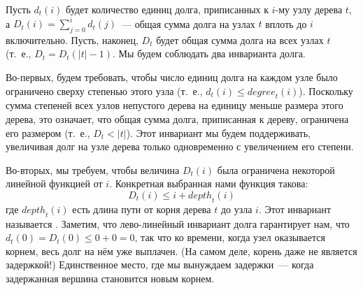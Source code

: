 Пусть $d_t(i)$ будет количество единиц долга, приписанных к $i$-му
узлу дерева $t$, а $D_t(i) = \sum_{j=0}^i d_t(j)$~--- общая сумма
долга на узлах $t$ вплоть до $i$ включительно. Пусть, наконец, $D_t$
будет общая сумма долга на всех узлах $t$ (т.~е., $D_t = D_t(|t| -
1)$. Мы будем соблюдать два инварианта долга.

Во-первых, будем требовать, чтобы число единиц долга на каждом узле
было ограничено сверху степенью этого узла (т.~е., $d_t(i) \le
\mathit{degree}_t(i)$). Поскольку сумма степеней всех узлов непустого дерева на
единицу меньше размера этого дерева, это означает, что общая сумма
долга, приписанная к дереву, ограничена его размером (т.~е., $D_t <
|t|$). Этот инвариант мы будем поддерживать, увеличивая долг на узле
дерева только одновременно с увеличением его степени.

Во-вторых, мы требуем, чтобы величина $D_t(i)$ была ограничена
некоторой линейной функцией от $i$. Конкретная выбранная нами функция
такова:
$$
D_t(i) \le i + \mathit{depth}_t(i)
$$
где $\mathit{depth}_t(i)$ есть длина пути от корня дерева $t$ до узла
$i$. Этот инвариант называется . Заметим, что лево-линейный
инвариант долга гарантирует нам, что $d_t(0) = D_t(0) \le 0 + 0 = 0$,
так что ко времени, когда узел оказывается корнем, весь долг на нём
уже выплачен. (На самом деле, корень даже не является задержкой!)
Единственное место, где мы вынуждаем задержки~---  когда задержанная
вершина становится новым корнем.


